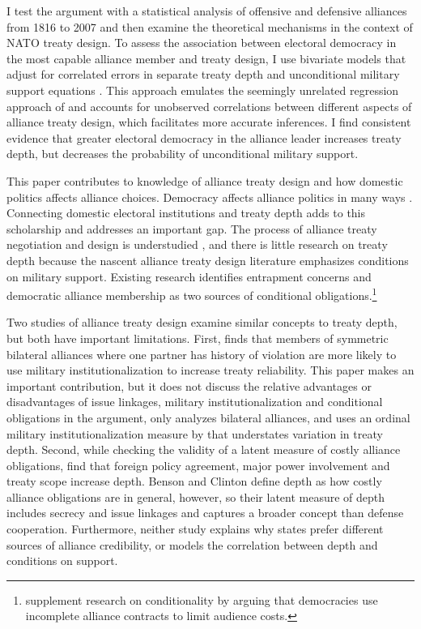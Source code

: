 \documentclass[12pt]{article}
\begin{document}
I test the argument with a statistical analysis of offensive and defensive alliances from 1816 to 2007 and then examine the theoretical mechanisms in the context of NATO treaty design.
To assess the association between electoral democracy in the most capable alliance member and treaty design, I use bivariate models that adjust for correlated errors in separate treaty depth and unconditional military support equations \citep{Braumoelleretal2018}. 
This approach emulates the seemingly unrelated regression approach of \citet{FjelstulReiter2019} and accounts for unobserved correlations between different aspects of alliance treaty design, which facilitates more accurate inferences. 
I find consistent evidence that greater electoral democracy in the alliance leader increases treaty depth, but decreases the probability of unconditional military support. 


This paper contributes to knowledge of alliance treaty design and how domestic politics affects alliance choices.
Democracy affects alliance politics in many ways \citep{LaiReiter2000, GiblerWolford2006, Mattes2012a, Warren2016, McManusYarhi-Milo2017}. 
Connecting domestic electoral institutions and treaty depth adds to this scholarship and addresses an important gap.
The process of alliance treaty negotiation and design is understudied \citep{Poast2019a}, and there is little research on treaty depth because the nascent alliance treaty design literature emphasizes conditions on military support.
Existing research identifies entrapment concerns \citep{Kim2011, Benson2012} and democratic alliance membership \citep{Mattes2012, Chibaetal2015} as two sources of conditional obligations.\footnote{\citet{FjelstulReiter2019} supplement research on conditionality by arguing that democracies use incomplete alliance contracts to limit audience costs.} 


Two studies of alliance treaty design examine similar concepts to treaty depth, but both have important limitations.   
First, \citet{Mattes2012} finds that members of symmetric bilateral alliances where one partner has history of violation are more likely to use military institutionalization to increase treaty reliability. 
This paper makes an important contribution, but it does not discuss the relative advantages or disadvantages of issue linkages, military institutionalization and conditional obligations in the argument, only analyzes bilateral alliances, and uses an ordinal military institutionalization measure by \citet{LeedsAnac2005} that understates variation in treaty depth.  
Second, while checking the validity of a latent measure of costly alliance obligations, \citet{BensonClinton2016} find that foreign policy agreement, major power involvement and treaty scope increase depth. 
Benson and Clinton define depth as how costly alliance obligations are in general, however, so their latent measure of depth includes secrecy and issue linkages and captures a broader concept than defense cooperation. 
Furthermore, neither study explains why states prefer different sources of alliance credibility, or models the correlation between depth and conditions on support. 
\end{document}
